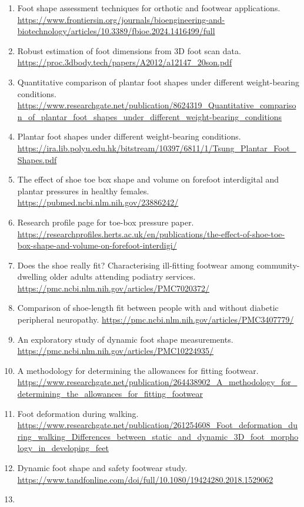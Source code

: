 \documentclass[
  10.5pt,
]{article}
\begin{document}
\begin{enumerate}
\item
  Foot shape assessment techniques for orthotic and footwear
  applications.
  \url{https://www.frontiersin.org/journals/bioengineering-and-biotechnology/articles/10.3389/fbioe.2024.1416499/full}
\item
  Robust estimation of foot dimensions from 3D foot scan data.
  \url{https://proc.3dbody.tech/papers/A2012/a12147_20son.pdf}
\item
  Quantitative comparison of plantar foot shapes under different
  weight-bearing conditions.
  \url{https://www.researchgate.net/publication/8624319_Quantitative_comparison_of_plantar_foot_shapes_under_different_weight-bearing_conditions}
\item
  Plantar foot shapes under different weight-bearing conditions.
  \url{https://ira.lib.polyu.edu.hk/bitstream/10397/6811/1/Tsung_Plantar_Foot_Shapes.pdf}
\item
  The effect of shoe toe box shape and volume on forefoot interdigital
  and plantar pressures in healthy females.
  \url{https://pubmed.ncbi.nlm.nih.gov/23886242/}
\item
  Research profile page for toe-box pressure paper.
  \url{https://researchprofiles.herts.ac.uk/en/publications/the-effect-of-shoe-toe-box-shape-and-volume-on-forefoot-interdigi/}
\item
  Does the shoe really fit? Characterising ill-fitting footwear among
  community-dwelling older adults attending podiatry services.
  \url{https://pmc.ncbi.nlm.nih.gov/articles/PMC7020372/}
\item
  Comparison of shoe-length fit between people with and without diabetic
  peripheral neuropathy.
  \url{https://pmc.ncbi.nlm.nih.gov/articles/PMC3407779/}
\item
  An exploratory study of dynamic foot shape measurements.
  \url{https://pmc.ncbi.nlm.nih.gov/articles/PMC10224935/}
\item
  A methodology for determining the allowances for fitting footwear.
  \url{https://www.researchgate.net/publication/264438902_A_methodology_for_determining_the_allowances_for_fitting_footwear}
\item
  Foot deformation during walking.
  \url{https://www.researchgate.net/publication/261254608_Foot_deformation_during_walking_Differences_between_static_and_dynamic_3D_foot_morphology_in_developing_feet}
\item
  Dynamic foot shape and safety footwear study.
  \url{https://www.tandfonline.com/doi/full/10.1080/19424280.2018.1529062}
\item

\end{enumerate}
\end{document}
